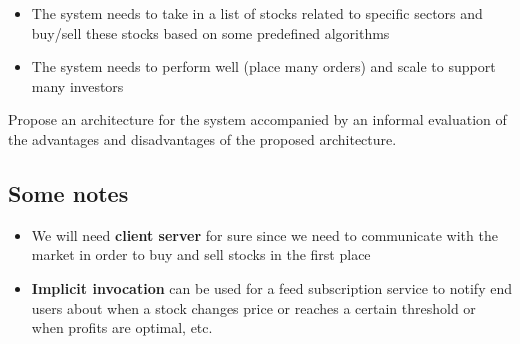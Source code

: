 \documentclass[12pt]{book}
\begin{document}
\begin{itemize}
    \item The system needs to take in a list of stocks related to specific sectors and buy/sell these stocks based on some predefined algorithms
    \item The system needs to perform well (place many orders) and scale to support many investors
\end{itemize}

Propose an architecture for the system accompanied by an informal evaluation of the advantages and disadvantages of the proposed architecture.

\subsection{Some notes}
\begin{itemize}
    \item We will need \textbf{client server} for sure since we need to communicate with the market in order to buy and sell stocks in the first place
    \item \textbf{Implicit invocation} can be used for a feed subscription service to notify end users about when a stock changes price or reaches a certain threshold or when profits are optimal, etc.
\end{itemize}
\end{document}
